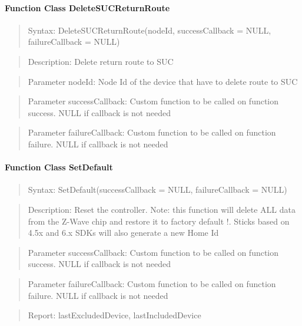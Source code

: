 \paragraph{Function Class DeleteSUCReturnRoute}
\begin{quote}Syntax: DeleteSUCReturnRoute(nodeId, successCallback = NULL, failureCallback = NULL)\end{quote}
\begin{quote}Description: Delete return route to SUC\end{quote}
\begin{quote}Parameter nodeId: Node Id of the device that have to delete route to SUC\end{quote}
\begin{quote}Parameter successCallback: Custom function to be called on function success. NULL if callback is not needed\end{quote}
\begin{quote}Parameter failureCallback: Custom function to be called on function failure. NULL if callback is not needed\end{quote}


\paragraph{Function Class SetDefault}
\begin{quote}Syntax: SetDefault(successCallback = NULL, failureCallback = NULL)\end{quote}
\begin{quote}Description: Reset the controller. Note: this function will delete ALL data from the Z-Wave chip and restore it to factory default !. Sticks based on 4.5x and 6.x SDKs will also generate a new Home Id\end{quote}
\begin{quote}Parameter successCallback: Custom function to be called on function success. NULL if callback is not needed\end{quote}
\begin{quote}Parameter failureCallback: Custom function to be called on function failure. NULL if callback is not needed\end{quote}
\begin{quote}Report: lastExcludedDevice, lastIncludedDevice\end{quote}

